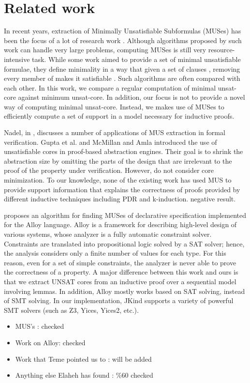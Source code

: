 \section{Related work}
\label{sec:related}

In recent years, extraction of Minimally Unsatisfiable Subformulas (MUSes) has been the focus of a lot of research work \cite{marques2010minimal, belov2012towards, ryvchin2011faster, belov2012computing, nadel2010boosting, ryvchin2011faster, }. Although algorithms proposed by such work can handle very large problems,
computing MUSes is still very resource-intensive task.
While some work aimed to provide a set of minimal unsatisfiable formulae, they define minimality in
a way that given a set of clauses , removing every member of  makes it satisfiable
\cite{belov2012computing}. 
Such algorithms are often compared with each other. In this work, we compare a regular computation of minimal unsat-core against minimum unsat-core. In addition, our focus is not to provide a novel way of computing minimal unsat-core. Instead, we makes use of MUSes to efficiently compute a set of support in a model necessary for inductive proofs.

Nadel, in \cite{nadel2010boosting}, discusses a 
number of applications of MUS extraction in formal verification. 
Gupta et al. \cite{gupta2003iterative} and McMillan and Amla \cite{mcmillan2003automatic} introduced the use of unsatisfiable cores in proof-based abstraction engines. Their goal is to shrink the abstraction size by omitting the parts of the design that are irrelevant to the proof of the property
under verification. However, \cite{gupta2003iterative, mcmillan2003automatic} do not consider core minimization. To our knowledge, none of the existing work
has used MUS to provide support information that explains
the correctness of proofs provided by different inductive techniques
including PDR and k-induction.
negative result.

\cite{torlak2008finding} proposes an algorithm for finding MUSes of declarative specification implemented for the Alloy language. Alloy is a framework for describing high-level design of various systems, whose analyzer is a fully automatic constraint solver. Constraints are translated into propositional logic solved by a SAT solver; hence, the analysis considers only a finite number of values for each type. For this reason, even for a set of simple constraints, the analyzer is never able to prove the correctness of a property. A major difference between this work and ours is that we 
extract UNSAT cores from an inductive proof over a sequential model involving lemmas. In addition, Alloy mostly works based on SAT solving, instead of SMT solving. In our implementation, JKind supports a variety of powerful SMT solvers (such as Z3, Yices, Yices2, etc.).

\begin{itemize}
    \item MUS's : checked
    \item Work on Alloy: checked
    \item Work that Teme pointed us to : will be added
    \item Anything else Elaheh has found : \%60 checked
\end{itemize}


